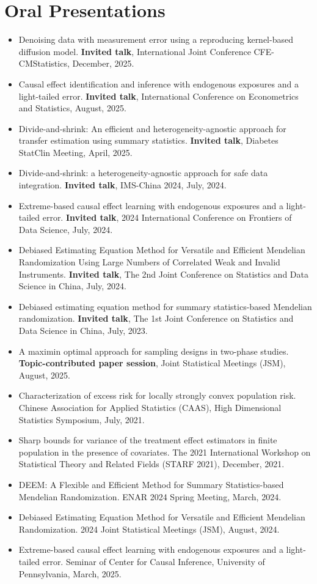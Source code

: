 \documentclass[letterpaper,12pt]{article}
\newcommand{\resumeSubHeadingListStart}{\begin{itemize}[leftmargin=*]}
\newcommand{\resumeSubHeadingListEnd}{\end{itemize}}
\newcommand{\shorterSection}[1]{\vspace{-10pt}\section{#1}}
\begin{document}
     \shorterSection{Oral Presentations}
     \resumeSubHeadingListStart
     \item{Denoising data with measurement error using a reproducing kernel-based diffusion model. {\bf Invited talk}, International Joint Conference CFE-CMStatistics, December, 2025.}
     \item{Causal effect identification and inference with endogenous exposures and a light-tailed error. {\bf Invited talk}, International Conference on Econometrics and Statistics, August, 2025.}
     \item{Divide-and-shrink: An efficient and heterogeneity-agnostic approach for   transfer estimation using summary statistics. {\bf Invited talk}, Diabetes StatClin Meeting, April, 2025.}
     \item{Divide-and-shrink: a heterogeneity-agnostic approach for safe data integration. {\bf Invited talk}, IMS-China 2024, July, 2024.}
     \item{Extreme-based causal effect learning with endogenous exposures and a light-tailed error. {\bf Invited talk}, 2024 International Conference on Frontiers of Data Science, July, 2024.}
     \item{Debiased Estimating Equation Method for Versatile and Efficient Mendelian Randomization Using Large Numbers of Correlated Weak and Invalid Instruments. {\bf Invited talk}, The 2nd Joint Conference on Statistics and Data Science in China, July, 2024.}
     \item{Debiased estimating equation method for summary statistics-based Mendelian randomization. {\bf Invited talk}, The 1st Joint Conference on Statistics and Data Science in China, July, 2023.}
     \item{A maximin optimal approach for sampling designs in two-phase studies. {\bf Topic-contributed paper session}, Joint Statistical Meetings (JSM), August, 2025.}
     \item{Characterization of excess risk for locally strongly
     	convex population risk. Chinese Association for Applied Statistics (CAAS), High Dimensional Statistics Symposium, July, 2021.}
     \item{Sharp bounds for variance of the treatment effect estimators in finite population in the presence of covariates. The 2021 International Workshop on	Statistical Theory and Related Fields (STARF 2021), December, 2021.}
     \item{DEEM: A Flexible and Efficient Method for Summary Statistics-based Mendelian Randomization. ENAR 2024 Spring Meeting, March, 2024.}
     \item{Debiased Estimating Equation Method for Versatile and Efficient Mendelian Randomization. 2024 Joint Statistical Meetings (JSM), August, 2024.}
     \item{Extreme-based causal effect learning with endogenous exposures and a light-tailed error. Seminar of Center for Causal Inference, University of Pennsylvania, March, 2025.}
     \resumeSubHeadingListEnd
     
\end{document}
